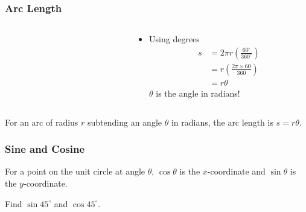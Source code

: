 \documentclass[20pt]{beamer}
\begin{document}
\begin{frame}
	\frametitle{Arc Length \footnotemark}
	\begin{columns}
		\begin{column}{0.45\textwidth}
			\begin{figure}[ht]
				\centering
				\label{fig:arclength}
			\end{figure}
		\end{column}
		\hfill
		\begin{column}{0.5\textwidth}
			\begin{itemize}
				\item<1-> Using degrees
				      \begin{align*}
					      s & = 2\pi r \left(\frac{60^\mathrm{\circ}}{360^\mathrm{\circ}}\right) \\
					        & = r \left(\frac{2\pi \times 60}{360}\right)                        \\
					        & = r \theta
				      \end{align*}
				      $\theta$ is the angle in radians!
			\end{itemize}
		\end{column}
	\end{columns}
	\begin{theorem}
		For an arc of radius $r$ subtending an angle $\theta$ in radians, the arc length is $s = r \theta$.
	\end{theorem}
\end{frame}

\begin{frame}
	\frametitle{Sine and Cosine \footnotemark}
	\begin{figure}[ht]
		\centering
		\label{fig:sincos}
	\end{figure}
	\begin{definition}
		For a point on the unit circle at angle $\theta$, $\cos \theta$ is the $x$-coordinate and $\sin \theta$ is the $y$-coordinate.
	\end{definition}
	\begin{example}
		Find $\sin 45^\mathrm{\circ}$ and $\cos 45^\mathrm{\circ}$.
	\end{example}
\end{frame}
\end{document}
